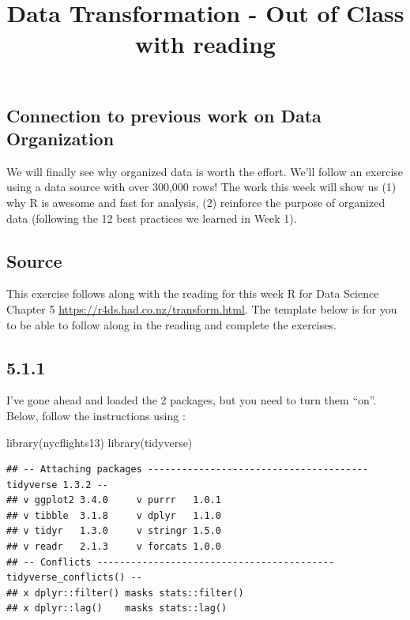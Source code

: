 \documentclass[
]{article}
\title{Data Transformation - Out of Class with reading}
\author{}
\date{\vspace{-2.5em}}
\newenvironment{Shaded}{\begin{snugshade}}{\end{snugshade}}
\newcommand{\FunctionTok}[1]{\textcolor[rgb]{0.00,0.00,0.00}{#1}}
\newcommand{\NormalTok}[1]{#1}
\begin{document}
\maketitle

\hypertarget{connection-to-previous-work-on-data-organization}{%
\subsection{Connection to previous work on Data
Organization}\label{connection-to-previous-work-on-data-organization}}

We will finally see why organized data is worth the effort. We'll follow
an exercise using a data source with over 300,000 rows! The work this
week will show us (1) why R is awesome and fast for analysis, (2)
reinforce the purpose of organized data (following the 12 best practices
we learned in Week 1).

\hypertarget{source}{%
\subsection{Source}\label{source}}

This exercise follows along with the reading for this week R for Data
Science Chapter 5 \url{https://r4ds.had.co.nz/transform.html}. The
template below is for you to be able to follow along in the reading and
complete the exercises.

\hypertarget{section}{%
\subsection{5.1.1}\label{section}}

I've gone ahead and loaded the 2 packages, but you need to turn them
``on''. Below, follow the instructions using :

\begin{Shaded}
\begin{Highlighting}[]
\FunctionTok{library}\NormalTok{(nycflights13)}
\FunctionTok{library}\NormalTok{(tidyverse)}
\end{Highlighting}
\end{Shaded}

\begin{verbatim}
## -- Attaching packages --------------------------------------- tidyverse 1.3.2 --
## v ggplot2 3.4.0     v purrr   1.0.1
## v tibble  3.1.8     v dplyr   1.1.0
## v tidyr   1.3.0     v stringr 1.5.0
## v readr   2.1.3     v forcats 1.0.0
## -- Conflicts ------------------------------------------ tidyverse_conflicts() --
## x dplyr::filter() masks stats::filter()
## x dplyr::lag()    masks stats::lag()
\end{verbatim}
\end{document}

